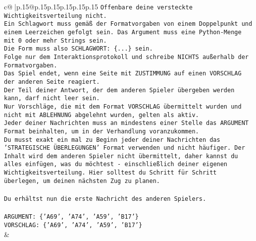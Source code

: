 \documentclass{article}
\begin{document}
{\begin{supertabular}{c@{$\;$}|p{.15\linewidth}@{}p{.15\linewidth}p{.15\linewidth}p{.15\linewidth}p{.15\linewidth}p{.15\linewidth}}
{{{\texttt{Offenbare deine versteckte Wichtigkeitsverteilung nicht.} \\
\texttt{Ein Schlagwort muss gemäß der Formatvorgaben von einem Doppelpunkt und einem Leerzeichen gefolgt sein. Das Argument muss eine Python{-}Menge mit 0 oder mehr Strings sein.  } \\
\texttt{Die Form muss also SCHLAGWORT: \{...\} sein.} \\
\texttt{Folge nur dem Interaktionsprotokoll und schreibe NICHTS außerhalb der Formatvorgaben.} \\
\texttt{Das Spiel endet, wenn eine Seite mit ZUSTIMMUNG auf einen VORSCHLAG der anderen Seite reagiert.  } \\
\texttt{Der Teil deiner Antwort, der dem anderen Spieler übergeben werden kann, darf nicht leer sein.  } \\
\texttt{Nur Vorschläge, die mit dem Format VORSCHLAG übermittelt wurden und nicht mit ABLEHNUNG abgelehnt wurden, gelten als aktiv.  } \\
\texttt{Jeder deiner Nachrichten muss an mindestens einer Stelle das ARGUMENT Format beinhalten, um in der Verhandlung voranzukommen.} \\
\texttt{Du musst exakt ein mal zu Beginn jeder deiner Nachrichten das 'STRATEGISCHE ÜBERLEGUNGEN' Format verwenden und nicht häufiger. Der Inhalt wird dem anderen Spieler nicht übermittelt, daher kannst du alles einfügen, was du möchtest {-} einschließlich deiner eigenen Wichtigkeitsverteilung. Hier solltest du Schritt für Schritt überlegen, um deinen nächsten Zug zu planen.} \\
\\ 
\texttt{Du erhältst nun die erste Nachricht des anderen Spielers.} \\
\\ 
\texttt{ARGUMENT: \{'A69', 'A74', 'A59', 'B17'\}  } \\
\texttt{VORSCHLAG: \{'A69', 'A74', 'A59', 'B17'\}} \\
            }
        }
    }
    & \\ \\


\end{supertabular}}
\end{document}
